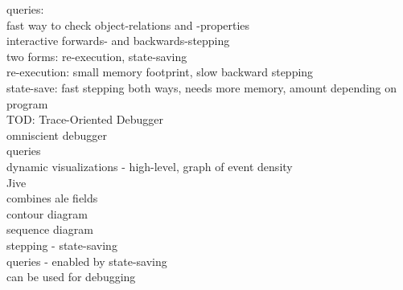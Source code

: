 queries:\\
	fast way to check object-relations and -properties\\


interactive forwards- and backwards-stepping\\
	two forms: re-execution, state-saving\\
	re-execution: small memory footprint,  slow backward stepping\\
	state-save: fast stepping both ways, needs more memory, amount depending on program\\
	
TOD: Trace-Oriented Debugger\\
	omniscient debugger\\
	queries\\
	dynamic visualizations - high-level, graph of event density\\
	

Jive\\
	combines ale fields\\
	contour diagram\\
	sequence diagram\\
	stepping - state-saving\\
	queries - enabled by state-saving\\
	can be used for debugging\\




